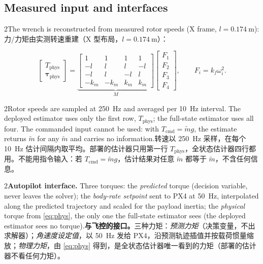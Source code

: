 \documentclass[10pt,a4paper]{article}
\numberwithin{equation}{section}
\newcommand{\Tphys}{T_{\mathrm{phys}}}
\newcommand{\tauphys}{\bm{\tau}_{\mathrm{phys}}}
\newcommand{\pair}[2]{\begin{paracol}{2}#1\switchcolumn #2\end{paracol}}
\newcommand{\bsub}[2]{\needspace{8\baselineskip}\subsection{#1\quad{\normalfont #2}}}
\begin{document}
\bsub{Measured input and interfaces}{测量输入与接口}
\pair{The wrench is reconstructed from measured rotor speeds (X frame,
$l=\SI{0.174}{\meter}$):}
{力/力矩由实测转速重建（X 型布局，$l=\SI{0.174}{\meter}$）：}
\begin{equation}
\begin{bmatrix}\Tphys\\ \tauphys\end{bmatrix}=
\underbrace{\begin{bmatrix}1&1&1&1\\-l&l&l&-l\\-l&l&-l&l\\-k_m&-k_m&k_m&k_m\end{bmatrix}}_{M}
\begin{bmatrix}F_1\\F_2\\F_3\\F_4\end{bmatrix},\qquad F_i=k_f\omega_i^2 .
\label{eq:phys}
\end{equation}
\pair{Rotor speeds are sampled at \SI{250}{\hertz} and averaged per
\SI{10}{\hertz} interval. The deployed estimator uses only the first row,
$\Tphys$; the full-state estimator uses all four. The commanded input cannot be
used: with $T_{\mathrm{cmd}}=\tilde m g$, the estimate returns $\tilde m$ for any
$\tilde m$ and carries no information.}
{转速以 \SI{250}{\hertz} 采样，在每个 \SI{10}{\hertz} 估计间隔内取平均。部署的估计器只用第一行 $\Tphys$，全状态估计器四行都用。不能用指令输入：若 $T_{\mathrm{cmd}}=\tilde m g$，估计结果对任意 $\tilde m$ 都等于 $\tilde m$，不含任何信息。}

\pair{\textbf{Autopilot interface.} Three torques: the \emph{predicted} torque
(decision variable, never leaves the solver); the \emph{body-rate setpoint}
sent to PX4 at \SI{50}{\hertz}, interpolated along the predicted trajectory
and scaled for the payload inertia; the \emph{physical} torque from
\eqref{eq:phys}, the only one the full-state estimator sees (the deployed
estimator sees no torque).}
{\textbf{与飞控的接口。}三种力矩：\emph{预测力矩}（决策变量，不出求解器）；\emph{角速度设定值}，以 \SI{50}{\hertz} 发给 PX4，沿预测轨迹插值并按载荷惯量缩放；\emph{物理力矩}，由 \eqref{eq:phys} 得到，是全状态估计器唯一看到的力矩（部署的估计器不看任何力矩）。}
\end{document}
